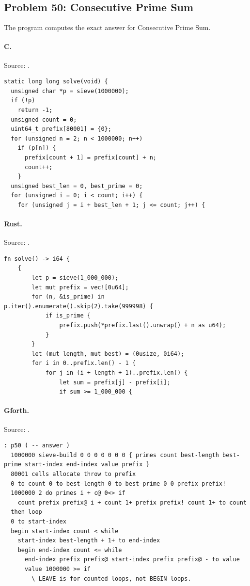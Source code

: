 \subsection{Problem 50: Consecutive Prime Sum}
\label{walkthrough:p50}
The program computes the exact answer for Consecutive Prime Sum.

\paragraph{C.} Source: .
\begin{lstlisting}
static long long solve(void) {
  unsigned char *p = sieve(1000000);
  if (!p)
    return -1;
  unsigned count = 0;
  uint64_t prefix[80001] = {0};
  for (unsigned n = 2; n < 1000000; n++)
    if (p[n]) {
      prefix[count + 1] = prefix[count] + n;
      count++;
    }
  unsigned best_len = 0, best_prime = 0;
  for (unsigned i = 0; i < count; i++) {
    for (unsigned j = i + best_len + 1; j <= count; j++) {
\end{lstlisting}

\paragraph{Rust.} Source: .
\begin{lstlisting}
fn solve() -> i64 {
    {
        let p = sieve(1_000_000);
        let mut prefix = vec![0u64];
        for (n, &is_prime) in p.iter().enumerate().skip(2).take(999998) {
            if is_prime {
                prefix.push(*prefix.last().unwrap() + n as u64);
            }
        }
        let (mut length, mut best) = (0usize, 0i64);
        for i in 0..prefix.len() - 1 {
            for j in (i + length + 1)..prefix.len() {
                let sum = prefix[j] - prefix[i];
                if sum >= 1_000_000 {
\end{lstlisting}

\paragraph{Gforth.} Source: .
\begin{lstlisting}
: p50 ( -- answer )
  1000000 sieve-build 0 0 0 0 0 0 0 { primes count best-length best-prime start-index end-index value prefix }
  80001 cells allocate throw to prefix
  0 to count 0 to best-length 0 to best-prime 0 0 prefix prefix!
  1000000 2 do primes i + c@ 0<> if
    count prefix prefix@ i + count 1+ prefix prefix! count 1+ to count
  then loop
  0 to start-index
  begin start-index count < while
    start-index best-length + 1+ to end-index
    begin end-index count <= while
      end-index prefix prefix@ start-index prefix prefix@ - to value
      value 1000000 >= if
        \ LEAVE is for counted loops, not BEGIN loops.
\end{lstlisting}

